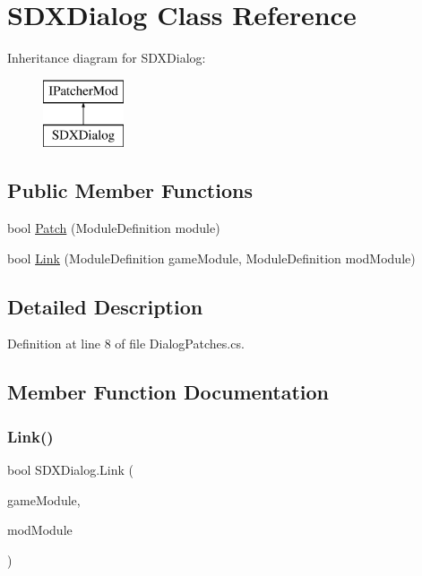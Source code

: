 \hypertarget{class_s_d_x_dialog}{}\section{S\+D\+X\+Dialog Class Reference}
\label{class_s_d_x_dialog}
Inheritance diagram for S\+D\+X\+Dialog\+:\begin{figure}[H]
\begin{center}
\leavevmode
\includegraphics[height=2.000000cm]{class_s_d_x_dialog}
\end{center}
\end{figure}
\subsection*{Public Member Functions}
\begin{DoxyCompactItemize}
\item 
bool \mbox{\hyperlink{class_s_d_x_dialog_a5ce84a3de0f89acb59cea0a370102eb7}{Patch}} (Module\+Definition module)
\item 
bool \mbox{\hyperlink{class_s_d_x_dialog_a3cc3613adec7a1bcb8898d461ac6eb6e}{Link}} (Module\+Definition game\+Module, Module\+Definition mod\+Module)
\end{DoxyCompactItemize}


\subsection{Detailed Description}


Definition at line 8 of file Dialog\+Patches.\+cs.



\subsection{Member Function Documentation}
\mbox{\label{class_s_d_x_dialog_a3cc3613adec7a1bcb8898d461ac6eb6e}} 
\subsubsection{\texorpdfstring{Link()}{Link()}}
{\footnotesize\ttfamily bool S\+D\+X\+Dialog.\+Link (\begin{DoxyParamCaption}\item[{Module\+Definition}]{game\+Module,  }\item[{Module\+Definition}]{mod\+Module }\end{DoxyParamCaption})}



